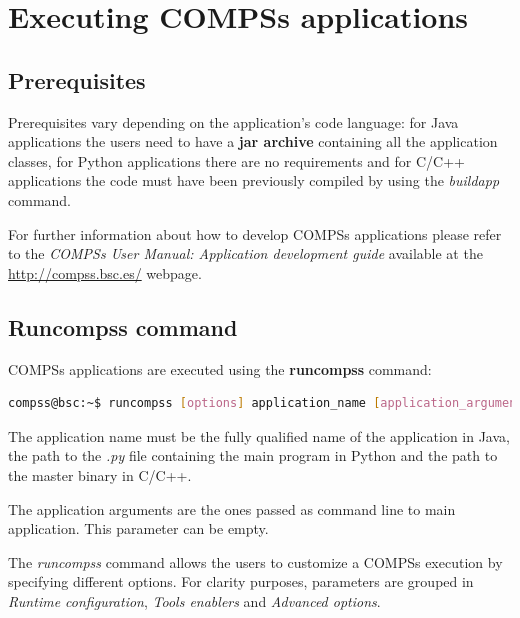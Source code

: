 \section{Executing COMPSs applications}
\label{sec:Executing}


\subsection{Prerequisites}
\label{subsec:prerequisites}
Prerequisites vary depending on the application's code language: for Java applications the users need to have
a \textbf{jar archive} containing all the application classes, for Python applications there are no requirements and for
C/C++ applications the code must have been previously compiled by using the \textit{buildapp} command.

For further information about how to develop COMPSs applications please refer to the \textit{COMPSs User 
Manual: Application development guide} available at the \url{http://compss.bsc.es/} webpage.


\subsection{Runcompss command}
\label{subsec:runcompss}
COMPSs applications are executed using the \textbf{runcompss} command:
\begin{lstlisting}[language=bash]
compss@bsc:~$ runcompss [options] application_name [application_arguments]
\end{lstlisting}

The application name must be the fully qualified name of the application in Java, the path to the \textit{.py} file
containing the main program in Python and the path to the master binary in C/C++. 

The application arguments are the ones passed as command line to main application. This parameter can be empty. 

The \textit{runcompss} command allows the users to customize a COMPSs execution by specifying different options.
For clarity purposes, parameters are grouped in \textit{Runtime configuration}, \textit{Tools enablers}
and \textit{Advanced options}.

